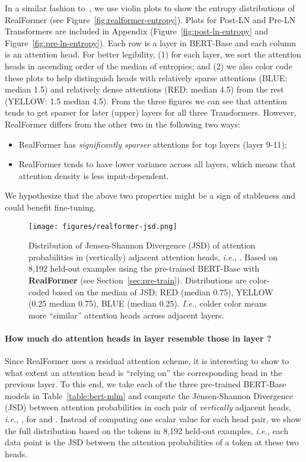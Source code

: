\documentclass[11pt,a4paper]{article}
\begin{document}
In a similar fashion to~\citet{Ramsauer-2020-hopfield}, we use violin plots to show the entropy distributions of RealFormer (see Figure~\ref{fig:realformer-entropy}). Plots for Post-LN and Pre-LN Transformers are included in Appendix (Figure~\ref{fig:post-ln-entropy} and Figure~\ref{fig:pre-ln-entropy}). Each row is a layer in BERT-Base and each column is an attention head. For better legibility, (1) for each layer, we sort the attention heads in ascending order of the median of entropies; and (2) we also color code these plots to help distinguish heads with relatively sparse attentions (BLUE: median  1.5) and relatively dense attentions (RED: median  4.5) from the rest (YELLOW: 1.5  median  4.5).
From the three figures we can see that attention tends to get sparser for later (upper) layers for all three Transformers. However, RealFormer differs from the other two in the following two ways:
\begin{itemize}
    \item RealFormer has \emph{significantly sparser} attentions for top layers (layer 9-11);
    \item RealFormer tends to have lower variance across all layers, which means that attention density is less input-dependent.
\end{itemize}
We hypothesize that the above two properties might be a sign of stableness and could benefit fine-tuning.


\begin{figure*}[!t]
\centering
\texttt{[image: figures/realformer-jsd.png]}
\caption{Distribution of Jensen-Shannon Divergence (JSD) of attention probabilities in (vertically) adjacent attention heads, \emph{i.e.}, . Based on 8,192 held-out examples using the pre-trained BERT-Base with \textbf{RealFormer} (see Section~\ref{sec:pre-train}). Distributions are color-coded based on the median of JSD: RED (median  0.75), YELLOW (0.25  median  0.75), BLUE (median  0.25). \emph{I.e.}, colder color means more ``similar'' attention heads across adjacent layers.}
\label{fig:realformer-jsd}
\end{figure*}


\paragraph{How much do attention heads in layer  resemble those in layer ?}
Since RealFormer uses a residual attention scheme, it is interesting to show to what extent an attention head is ``relying on'' the corresponding head in the previous layer.
To this end, we take each of the three pre-trained BERT-Base models in Table~\ref{table:bert-mlm} and compute the Jensen-Shannon Divergence (JSD) between attention probabilities in each pair of \emph{vertically} adjacent heads, \emph{i.e.}, , for  and .
Instead of computing one scalar value for each head pair, we show the full distribution based on the tokens in 8,192 held-out examples, \emph{i.e.}, each data point is the JSD between the attention probabilities of a token at these two heads.
\end{document}
